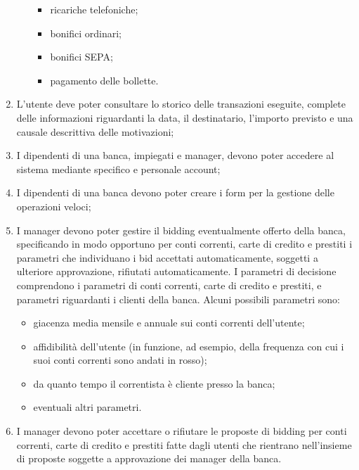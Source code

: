 \begin{enumerate}
\begin{enumerate}
			\begin{itemize}
				\item ricariche telefoniche;
				\item bonifici ordinari;
				\item bonifici SEPA;
				\item pagamento delle bollette.
			\end{itemize}
	\end{enumerate}
	\item \label{itm:utente:funzionali:storico} L'utente deve poter consultare lo storico delle transazioni eseguite, complete delle informazioni riguardanti la data, il destinatario, l'importo previsto e una causale descrittiva delle motivazioni;
	\item \label{itm:utente:funzionali:dipendenti:accesso} I dipendenti di una banca, impiegati e manager, devono poter accedere al sistema mediante specifico e personale account;
	\item \label{itm:utente:funzionali:dipendenti:operazioni-veloci} I dipendenti di una banca devono poter creare i form per la gestione delle operazioni veloci;
	\item \label{itm:utente:funzionali:management:bidding:creazione} I manager devono poter gestire il bidding eventualmente offerto della banca, specificando in modo opportuno per conti correnti, carte di credito e prestiti i parametri che individuano i bid accettati automaticamente, soggetti a ulteriore approvazione, rifiutati automaticamente.
	I parametri di decisione comprendono i parametri di conti correnti, carte di credito e prestiti, e parametri riguardanti i clienti della banca.
	Alcuni possibili parametri sono:
		\begin{itemize}
			\item giacenza media mensile e annuale sui conti correnti dell'utente;
			\item affidibilit\`a dell'utente (in funzione, ad esempio, della frequenza con cui i suoi conti correnti sono andati in rosso);
			\item da quanto tempo il correntista \`e cliente presso la banca;
			\item eventuali altri parametri.
		\end{itemize}
	\item \label{itm:utente:funzionali:management:bidding:approvazione} I manager devono poter accettare o rifiutare le proposte di bidding per conti correnti, carte di credito e prestiti fatte dagli utenti che rientrano nell'insieme di proposte soggette a approvazione dei manager della banca.

\end{enumerate}
